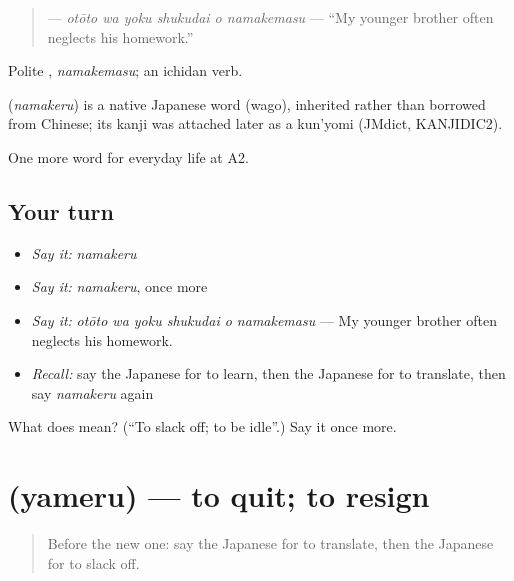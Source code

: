 \begin{quote}
\textbf{   } — \emph{otōto wa yoku shukudai o namakemasu} — \textquotedblleft{}My younger brother often neglects his homework.\textquotedblright{}
\end{quote}

Polite \textbf{}, \emph{namakemasu}; an ichidan verb.

\begin{cousinweb}
\textbf{} (\emph{namakeru}) is a native Japanese word (wago), inherited rather than borrowed from Chinese; its kanji was attached later as a kun'yomi (JMdict, KANJIDIC2).
\end{cousinweb}

\begin{grammarlens}[title={What you've built}]
One more word for everyday life at A2.
\end{grammarlens}

\subsection*{Your turn}
\begin{itemize}
\raggedright
  \item \emph{Say it:} \emph{namakeru}
  \item \emph{Say it:} \emph{namakeru}, once more
  \item \emph{Say it:} \emph{otōto wa yoku shukudai o namakemasu} — My younger brother often neglects his homework.
  \item \emph{Recall:} say the Japanese for to learn, then the Japanese for to translate, then say \emph{namakeru} again
\end{itemize}

\begin{tcolorbox}[breakable,colback=teal!4,colframe=teal!35!black,title={Before you move on}]
What does  mean? (\textquotedblleft{}To slack off; to be idle\textquotedblright{}.) Say it once more.
\end{tcolorbox}
\section[\texorpdfstring{\ja{やめる} (yameru)}{やめる (yameru)}]{ (yameru) — to quit; to resign}

\label{lesson:JA-C228-yameru}



\begin{quote}
Before the new one: say the Japanese for to translate, then the Japanese for to slack off.
\end{quote}


